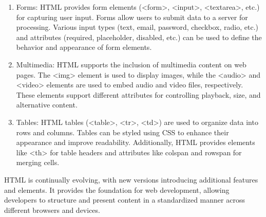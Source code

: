 \documentclass[12 pt, oneside]{book}
\begin{document}
\begin{enumerate}
\item Forms: HTML provides form elements (<form>, <input>, <textarea>, etc.) for capturing user input. Forms allow users to submit data to a server for processing. Various input types (text, email, password, checkbox, radio, etc.) and attributes (required, placeholder, disabled, etc.) can be used to define the behavior and appearance of form elements.

\item Multimedia: HTML supports the inclusion of multimedia content on web pages. The <img> element is used to display images, while the <audio> and <video> elements are used to embed audio and video files, respectively. These elements support different attributes for controlling playback, size, and alternative content.

\item Tables: HTML tables (<table>, <tr>, <td>) are used to organize data into rows and columns. Tables can be styled using CSS to enhance their appearance and improve readability. Additionally, HTML provides elements like <th> for table headers and attributes like colspan and rowspan for merging cells.
\end{enumerate}
HTML is continually evolving, with new versions introducing additional features and elements. It provides the foundation for web development, allowing developers to structure and present content in a standardized manner across different browsers and devices.
\end{document}
